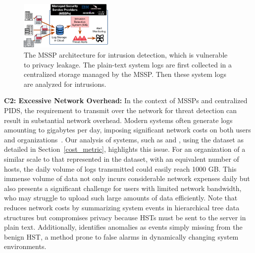 \begin{figure}[t!]
    \centering
    \includegraphics[width=0.4\textwidth]{fig/mssp.pdf}
    \caption{The MSSP architecture for intrusion detection, which is vulnerable to privacy leakage. The plain-text system logs are first collected in a centralized storage managed by the MSSP. Then these system logs are analyzed for intrusions.}
    \label{mssp}
    \vspace{-4ex}
  \end{figure}
    
\smallskip
\noindent
\textbf{C2: Excessive Network Overhead:} In the context of MSSPs and centralized PIDS, the requirement to transmit \logs over the network for threat detection can result in substantial network overhead. Modern systems often generate logs amounting to gigabytes per day, imposing significant network costs on both users and organizations~\cite{inam2023sok,hossain+depend}. Our analysis of systems, such as \flash and \kairos, using the \optc dataset as detailed in Section~\ref{cost_metric}, highlights this issue. For an organization of a similar scale to that represented in the \optc dataset, with an equivalent number of hosts, the daily volume of logs transmitted could easily reach 1000 GB. This immense volume of data not only incurs considerable network expenses daily but also presents a significant challenge for users with limited network bandwidth, who may struggle to upload such large amounts of data efficiently. Note that \disdet reduces network costs by summarizing system events in hierarchical tree data structures but compromises privacy because HSTs must be sent to the server in plain text. Additionally, \disdet identifies anomalies as events simply missing from the benign HST, a method prone to false alarms in dynamically changing system environments.


